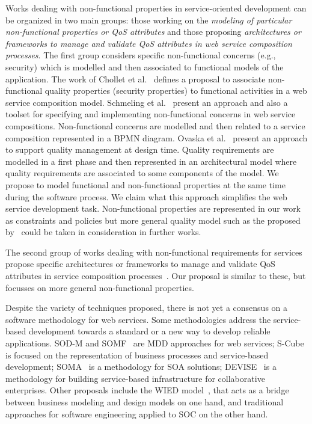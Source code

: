 \documentclass{llncs}
\theoremstyle{plain}
\theoremstyle{plain}
\theoremstyle{plain}
\begin{document}
Works dealing with non-functional properties in service-oriented 
development can be organized in two main groups: those working on the \textit{modeling 
of particular non-functional properties or QoS attributes} and those 
proposing \textit{architectures or frameworks to manage and 
validate QoS attributes in web service composition processes}. 
The first group considers specific non-functional concerns (e.g., security)
which is modelled and then associated to functional models of the application. 
The work of Chollet et al.~\cite{CholletL09} defines a proposal to associate non-functional 
quality properties (security properties) to functional activities in a web service composition model. Schmeling et al.~\cite{SchmelingCM11} present 
an approach and also a toolset for specifying and implementing non-functional 
concerns in web service compositions.
Non-functional concerns are modelled and then related to a service composition 
represented in a BPMN diagram. 
Ovaska et al.~\cite{OvaskaEHPA10} present an approach to 
support quality management at design time. 
Quality requirements are modelled in a first phase and then
represented in an architectural model where quality requirements are associated to some
components of the model. 
We propose to model functional and non-functional properties at the same time during the software process.
We claim what this approach simplifies the web service development task. 
Non-functional properties are represented in our work as constraints and policies 
but more general quality model such as the proposed by~\cite{Goeb2011,Klass2009} 
could be taken in consideration in further works. 


The second group of works dealing with non-functional requirements for services 
propose specific architectures or frameworks to manage and validate 
QoS attributes in service composition processes~\cite{XiaoCZBOLH08,Babamir2010,Karunamurthy2012787}. 
Our proposal is similar to these, but focusses on more general non-functional properties.

Despite the variety of techniques proposed, there is not yet a consensus on a software methodology 
for web services. 
Some methodologies address the service-based 
development towards a standard or a new way to develop reliable applications. 
SOD-M and SOMF~\cite{somf} are MDD approaches for web services; 
S-Cube~\cite{scube2010book} is focused on the representation of business processes and 
service-based development; SOMA~\cite{soma} is a methodology 
for SOA solutions; 
DEVISE~\cite{DEVISE} is a
methodology for building service-based infrastructure for collaborative
enterprises. 
Other proposals include the WIED model~\cite{TongrungrojanaL04}, 
that acts as a bridge between business modeling and design models on one hand, and traditional 
approaches for software engineering applied to SOC on the other hand.
\end{document}
